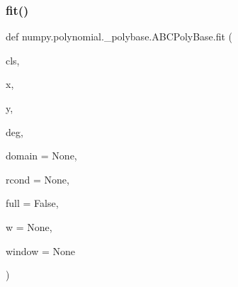 \subsubsection{\texorpdfstring{fit()}{fit()}}
{\footnotesize\ttfamily def numpy.\+polynomial.\+\_\+polybase.\+A\+B\+C\+Poly\+Base.\+fit (\begin{DoxyParamCaption}\item[{}]{cls,  }\item[{}]{x,  }\item[{}]{y,  }\item[{}]{deg,  }\item[{}]{domain = {\ttfamily None},  }\item[{}]{rcond = {\ttfamily None},  }\item[{}]{full = {\ttfamily False},  }\item[{}]{w = {\ttfamily None},  }\item[{}]{window = {\ttfamily None} }\end{DoxyParamCaption})}

